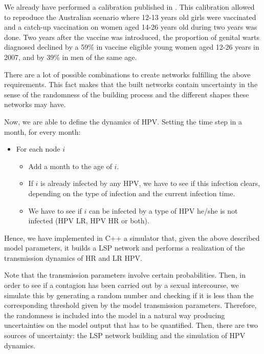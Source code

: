 We already have performed a calibration published in \cite{Acedo2017}. This calibration allowed to reproduce the Australian scenario \cite{DezDomingo2017} where 12-13 years old girls were vaccinated and a catch-up vaccination on women aged 14-26 years old during two years was done. Two years after the vaccine was introduced, the proportion of genital warts diagnosed declined by a 59\% in vaccine eligible young women aged 12-26 years in 2007, and by 39\% in men of the same age.

There are a lot of possible combinations to create networks fulfilling the above requirements. This fact makes that the built networks contain uncertainty in the sense of the randomness of the building process and the different shapes these networks may have. 

Now, we are able to define the dynamics of HPV. Setting the time step in a month, for every month:

\begin{itemize}
	\item  For each node $i$
	\begin{itemize}
		\item Add a month to the age of $i$.
		\item If $i$ is already infected by any HPV, we have to see if this infection clears, depending on the type of infection and the current infection time.
		\item We have to see if $i$ can be infected by a type of HPV he/she is not infected (HPV LR, HPV HR or both).
	\end{itemize}
\end{itemize}

Hence, we have implemented in C++ a simulator that, given the above described model parameters, it builds a LSP network and performs a realization of the transmission dynamics of HR and LR HPV.

Note that the transmission parameters involve certain probabilities. Then, in order to see if a contagion has been carried out by a sexual intercourse, we simulate this by generating a random number and checking if it is less than the corresponding threshold given by the model transmission parameters. Therefore, the randomness is included into the model in a natural way producing uncertainties on the model output that has to be quantified. Then, there are two sources of uncertainty: the LSP network building and the simulation of HPV dynamics.

